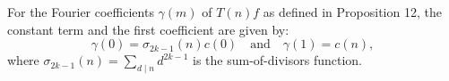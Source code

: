 For the Fourier coefficients $\gamma(m)$ of $T(n)f$ as defined in Proposition 12, the constant term and the first coefficient are given by:
$$\gamma(0) = \sigma_{2k-1}(n)c(0) \quad \text{and} \quad \gamma(1) = c(n),$$
where $\sigma_{2k-1}(n) = \sum_{d \mid n} d^{2k-1}$ is the sum-of-divisors function.
